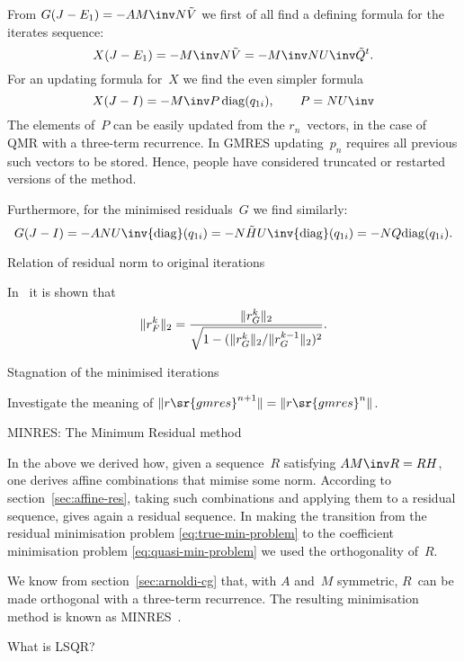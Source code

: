 \documentclass[11pt]{artikel3}
\begin{document}
\begin{Outline}
From $G(J-E_1)=-AM\inv N\tilde V$ we first of all find a defining formula
for the iterates sequence:
\begin{equation}
    X(J-E_1)=-M\inv N\tilde V=-M\inv NU\inv \tilde Q^t.
    \label{eq:minres-xconstruct}\end{equation}
For an updating formula for~$X$ we find the even simpler formula
\begin{equation}
    X(J-I) = -M\inv P\,{\rm diag}(q_{1i}),\qquad P=NU\inv
    \label{eq:minres-xupdate}\end{equation}
The elements of~$P$ can be easily updated from the $r_n$~vectors, in the
case of QMR with a three-term recurrence. In GMRES updating~$p_n$
requires all previous such vectors to be stored. Hence, people have
considered truncated or restarted versions of the method.

Furthermore, for the minimised residuals~$G$ we find similarly:
        \[ G(J-I) = -ANU\inv {\rm diag}(q_{1i}) 
                = -N\tilde HU\inv {\rm diag}(q_{1i})
                = -NQ {\rm diag}(q_{1i}). \]

 {Relation of residual norm to original iterations}

In~\cite{CuGr:relations} it is shown that
\[ \|r\sp k_F\|_2={\|r\sp k_G\|_2\over
    \sqrt{1-(\|r\sp k_G\|_2/\|r\sp{k-1}_G\|_2)^2}}. \]

 {Stagnation of the minimised iterations}

Investigate the meaning of
$\|r\sr{gmres}\sp{n+1}\|=\|r\sr{gmres}\sp{n}\|$.

 {MINRES: The Minimum Residual method}
\label{sec:minres}

In the above we derived how, given a sequence~$R$ satisfying $AM\inv R=RH$,
one derives affine combinations that mimise some norm.
According to section~\ref{sec:affine-res}, taking such combinations
and applying them to a residual sequence, gives again a residual sequence.
In making the transition from 
the residual minimisation problem \eqref{eq:true-min-problem}
to the coefficient minimisation problem \eqref{eq:quasi-min-problem}
we used the orthogonality of~$R$. 

We know from section~\ref{sec:arnoldi-cg} that,
with $A$ and~$M$ symmetric, $R$~can be made orthogonal
with a three-term recurrence.
The resulting minimisation method is known as MINRES~\cite{PaSa:indefinite}.

\begin{question} 
What is LSQR?
\end{question}


\end{Outline}
\end{document}

